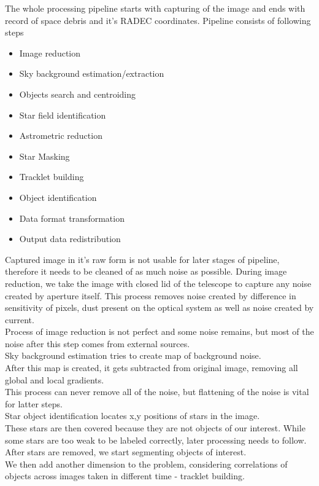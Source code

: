 \documentclass[12pt, a4paper, oneside]{book}
\begin{document}
The whole processing pipeline starts with capturing of the image and ends with record of space debris and it's RADEC coordinates.
Pipeline consists of following steps \cite{silhaetal}
\begin{itemize}
    \item{Image reduction}
    \item{Sky background estimation/extraction}
    \item{Objects search and centroiding}
    \item{Star field identification}
    \item{Astrometric reduction}
    \item{Star Masking}
    \item{Tracklet building}
    \item{Object identification}
    \item{Data format transformation}
    \item{Output data redistribution}
\end{itemize}
\par
\indent
Captured image in it's raw form is not usable for later stages of pipeline, therefore it needs to be cleaned of as much noise as possible.
During image reduction, we take the image with closed lid of the telescope to capture any noise created by aperture itself.
This process removes noise created by difference in sensitivity of pixels, dust present on the optical system as well as noise created by current.\\
\indent
Process of image reduction is not perfect and some noise remains, but most of the noise after this step comes from external sources.\\
\indent
Sky background estimation tries to create map of background noise.\\
After this map is created, it gets subtracted from original image, removing all global and local gradients.\\
This process can never remove all of the noise, but flattening of the noise is vital for latter steps.\\
\indent
Star object identification locates x,y positions of stars in the image.\\
These stars are then covered because they are not objects of our interest.
While some stars are too weak to be labeled correctly, later processing needs to follow.\\
\indent
After stars are removed, we start segmenting objects of interest.\\
We then add another dimension to the problem, considering correlations of objects across images taken in different time - tracklet building.\\
\end{document}
